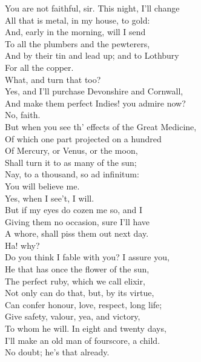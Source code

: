 \documentclass[a4paper,oneside]{memoir}
\begin{document}
\begin{drama*}
You are not faithful, sir. This night, I'll change\\
All that is metal, in my house, to gold:\\
And, early in the morning, will I send\\
To all the plumbers and the pewterers,\\
And by their tin and lead up; and to Lothbury\\
For all the copper.\\
\surlyspeaks {} What, and turn that too?\\
\mammonspeaks Yes, and I'll purchase Devonshire and Cornwall,\\
And make them perfect Indies! you admire now?\\
\surlyspeaks No, faith.\\
\mammonspeaks {} But when you see th' effects of the Great Medicine,\\
Of which one part projected on a hundred\\
Of Mercury, or Venus, or the moon,\\
Shall turn it to as many of the sun;\\
Nay, to a thousand, so ad infinitum:\\
You will believe me.\\
\surlyspeaks {} Yes, when I see't, I will.\\
But if my eyes do cozen me so, and I\\
Giving them no occasion, sure I'll have\\
A whore, shall piss them out next day.\\
\mammonspeaks {} Ha! why?\\
Do you think I fable with you? I assure you,\\
He that has once the flower of the sun,\\
The perfect ruby, which we call elixir,\\
Not only can do that, but, by its virtue,\\
Can confer honour, love, respect, long life;\\
Give safety, valour, yea, and victory,\\
To whom he will. In eight and twenty days,\\
I'll make an old man of fourscore, a child.\\
\surlyspeaks No doubt; he's that already.\\

\end{drama*}
\end{document}
